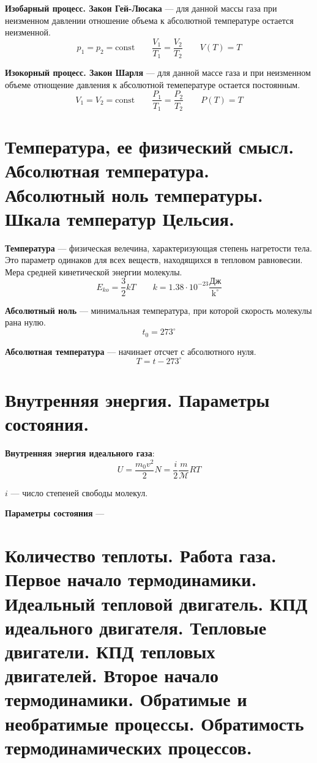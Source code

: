 \documentclass{report}
\begin{document}
{\bf Изобарный процесс. Закон Гей-Люсака} ---
для данной массы газа при неизменном давлении отношение объема к абсолютной 
температуре остается неизменной.
$$
p_1=p_2=\textrm{const} \qquad 
\frac{V_1}{T_1}=\frac{V_2}{T_2} \qquad
V(T) = T
$$

{\bf Изокорный процесс. Закон Шарля} ---
для данной массе газа и при неизменном объеме отнощение давления к абсолютной темепературе
остается постоянным.
$$
V_1=V_2=\textrm{const} \qquad 
\frac{P_1}{T_1}=\frac{P_2}{T_2} \qquad
P(T) = T
$$



\part{Температура, ее физический смысл. 
Абсолютная температура. 
Абсолютный ноль температуры. 
Шкала температур Цельсия.}

{\bf Температура} ---
физическая велечина, характеризующая степень нагретости тела. Это параметр одинаков для всех 
веществ, находящихся в тепловом равновесии. Мера средней кинетической энергии молекулы.
$$
E_{ko}=\frac{3}{2}kT \qquad k=1.38\cdot 10^{-23}\frac{\textrm{Дж}}{\textrm{k}^\circ}
$$

{\bf Абсолютный ноль} ---
минимальная температура, при которой скорость молекулы рана нулю.
$$
t_0=273^\circ
$$

{\bf Абсолютная температура} ---
начинает отсчет с абсолютного нуля.
$$
T=t-273^\circ
$$



\part{Внутренняя энергия. 
Параметры состояния.}

{\bf Внутренняя энергия идеального газа}:
$$
U=\frac{m_0v^2}{2}N=\frac{i}{2}\frac{m}{\mathcal{M}}RT
$$

$i$ --- число степеней свободы молекул.

{\bf Параметры состояния} ---



\part{Количество теплоты. 
Работа газа. 
Первое начало термодинамики.
Идеальный тепловой двигатель. 
КПД идеального двигателя. 
Тепловые двигатели. 
КПД тепловых двигателей. 
Второе начало термодинамики. 
Обратимые и необратимые процессы. 
Обратимость термодинамических процессов.}
\end{document}
